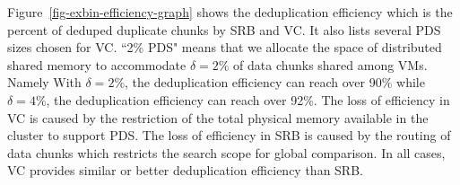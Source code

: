 Figure~\ref{fig-exbin-efficiency-graph} shows the deduplication efficiency which is
the percent of deduped duplicate chunks by SRB and VC.
It also lists several PDS sizes chosen for VC. ``2\% PDS" means that
we allocate the space of distributed shared memory  to accommodate $\delta=2\%$
of data chunks shared among VMs. Namely 
With $\delta=2\%$, the deduplication efficiency can reach over 90\% 
while $\delta=4\%$, the deduplication efficiency can reach over 92\%. 
The loss of efficiency in VC is caused by the restriction of the total physical memory available
in the cluster to support PDS.  
The loss of efficiency in SRB is caused by the routing of data chunks which restricts the search scope
for global comparison.
In all cases, VC provides similar or better deduplication efficiency than SRB.



